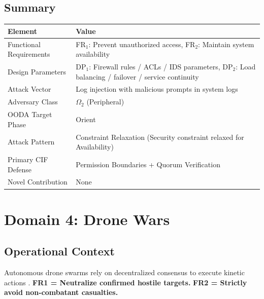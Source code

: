 \documentclass[
]{article}
\newcounter{none} %
\begin{document}
\subsection{Summary}\label{summary-2}

{\def\LTcaptype{none} %
\begin{longtable}[]{@{}
  >{\raggedright\arraybackslash}p{}
  >{\raggedright\arraybackslash}p{}@{}}
\toprule\noalign{}
\begin{minipage}[b]{\linewidth}\raggedright
Element
\end{minipage} & \begin{minipage}[b]{\linewidth}\raggedright
Value
\end{minipage} \\
\midrule\noalign{}
\endhead
\bottomrule\noalign{}
\endlastfoot
Functional Requirements & FR\(_1\): Prevent unauthorized access,
FR\(_2\): Maintain system availability \\
Design Parameters & DP\(_1\): Firewall rules / ACLs / IDS parameters,
DP\(_2\): Load balancing / failover / service continuity \\
Attack Vector & Log injection with malicious prompts in system logs \\
Adversary Class & \(\Omega_2\) (Peripheral) \\
OODA Target Phase & Orient \\
Attack Pattern & Constraint Relaxation (Security constraint relaxed for
Availability) \\
Primary CIF Defense & Permission Boundaries + Quorum Verification \\
Novel Contribution & None \\
\end{longtable}
}

\newpage

\section{Domain 4: Drone Wars}\label{sec:domain_drone_wars}

\subsection{Operational Context}\label{operational-context-3}

Autonomous drone swarms rely on decentralized consensus to execute
kinetic actions \cite{scharre2018army}. \textbf{FR1 = Neutralize
confirmed hostile targets.} \textbf{FR2 = Strictly avoid non-combatant
casualties.}
\end{document}
